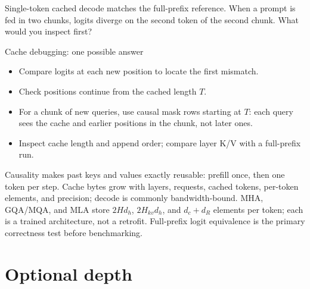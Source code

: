 \documentclass[handout]{beamer}
\begin{document}
{Single-token cached decode matches the full-prefix reference. When a prompt is fed in two chunks, logits diverge on the second token of the second chunk. What would you inspect first?}

\begin{frame}{Cache debugging: one possible answer}
  \begin{itemize}
    \item Compare logits at each new position to locate the first mismatch.
    \item Check positions continue from the cached length $T$.
    \item For a chunk of new queries, use causal mask rows starting at $T$: each query sees the cache and earlier positions in the chunk, not later ones.
    \item Inspect cache length and append order; compare layer K/V with a full-prefix run.
  \end{itemize}
\end{frame}

\takeaways
{Causality makes past keys and values exactly reusable: prefill once, then one token per step.}
{Cache bytes grow with layers, requests, cached tokens, per-token elements, and precision; decode is commonly bandwidth-bound.}
{MHA, GQA/MQA, and MLA store $2Hd_h$, $2H_{kv}d_h$, and $d_c+d_R$ elements per token; each is a trained architecture, not a retrofit.}
{Full-prefix logit equivalence is the primary correctness test before benchmarking.}
\appendix
\section{Optional depth}
\end{document}

